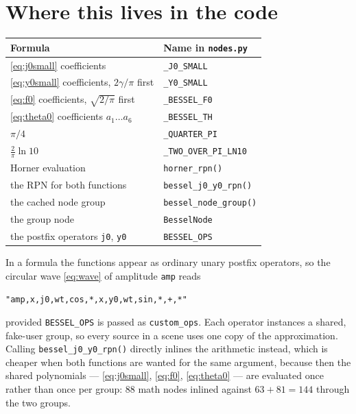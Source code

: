 \documentclass[11pt,a4paper]{article}
\newcommand{\node}[1]{\texttt{#1}}
\begin{document}
\section{Where this lives in the code}

\begin{center}
\begin{tabular}{ll}
\toprule
\textbf{Formula} & \textbf{Name in \node{nodes.py}} \\
\midrule
\eqref{eq:j0small} coefficients              & \node{\_J0\_SMALL} \\
\eqref{eq:y0small} coefficients, $2\gamma/\pi$ first & \node{\_Y0\_SMALL} \\
\eqref{eq:f0} coefficients, $\sqrt{2/\pi}$ first & \node{\_BESSEL\_F0} \\
\eqref{eq:theta0} coefficients $a_1\ldots a_6$ & \node{\_BESSEL\_TH} \\
$\pi/4$                                      & \node{\_QUARTER\_PI} \\
$\tfrac{2}{\pi}\ln 10$                       & \node{\_TWO\_OVER\_PI\_LN10} \\
\midrule
Horner evaluation                            & \node{horner\_rpn()} \\
the RPN for both functions                   & \node{bessel\_j0\_y0\_rpn()} \\
the cached node group                        & \node{bessel\_node\_group()} \\
the group node                               & \node{BesselNode} \\
the postfix operators \node{j0}, \node{y0}   & \node{BESSEL\_OPS} \\
\bottomrule
\end{tabular}
\end{center}

In a formula the functions appear as ordinary unary postfix operators, so the
circular wave \eqref{eq:wave} of amplitude \node{amp} reads

\begin{center}
\node{"amp,x,j0,wt,cos,*,x,y0,wt,sin,*,+,*"}
\end{center}

\noindent
provided \node{BESSEL\_OPS} is passed as \node{custom\_ops}. Each operator
instances a shared, fake-user group, so every source in a scene uses one copy
of the approximation. Calling \node{bessel\_j0\_y0\_rpn()} directly inlines
the arithmetic instead, which is cheaper when both functions are wanted for
the same argument, because then the shared polynomials
--- \eqref{eq:j0small}, \eqref{eq:f0}, \eqref{eq:theta0} --- are evaluated
once rather than once per group: 88 math nodes inlined against
$63+81=144$ through the two groups.
\end{document}
